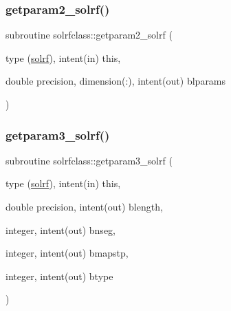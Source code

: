 \mbox{\label{namespacesolrfclass_ac8cc63a77159c54d547e156bf816e7d1}} 
\subsubsection{\texorpdfstring{getparam2\_solrf()}{getparam2\_solrf()}}
{\footnotesize\ttfamily subroutine solrfclass\+::getparam2\+\_\+solrf (\begin{DoxyParamCaption}\item[{type (\mbox{\hyperlink{namespacesolrfclass_structsolrfclass_1_1solrf}{solrf}}), intent(in)}]{this,  }\item[{double precision, dimension(\+:), intent(out)}]{blparams }\end{DoxyParamCaption})}

\mbox{\label{namespacesolrfclass_abb727d5c5f8ebd6af19e036fe9204923}} 
\subsubsection{\texorpdfstring{getparam3\_solrf()}{getparam3\_solrf()}}
{\footnotesize\ttfamily subroutine solrfclass\+::getparam3\+\_\+solrf (\begin{DoxyParamCaption}\item[{type (\mbox{\hyperlink{namespacesolrfclass_structsolrfclass_1_1solrf}{solrf}}), intent(in)}]{this,  }\item[{double precision, intent(out)}]{blength,  }\item[{integer, intent(out)}]{bnseg,  }\item[{integer, intent(out)}]{bmapstp,  }\item[{integer, intent(out)}]{btype }\end{DoxyParamCaption})}

\mbox{\label{namespacesolrfclass_a617250299f3409a89fdb6651f353bc8d}} 
